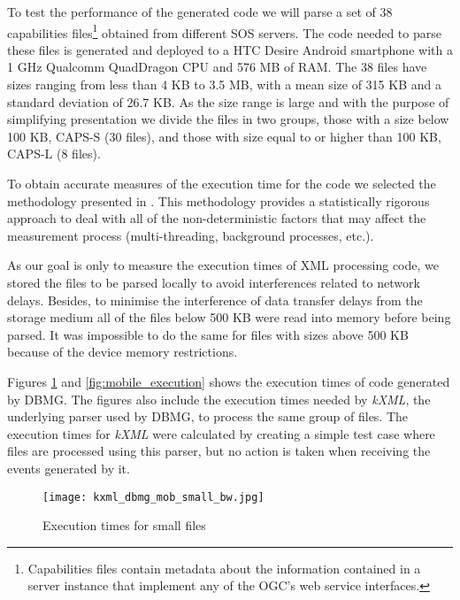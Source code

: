\documentclass{sig-alternate}
\begin{document}
To test the performance of the generated code  we will parse a set of 38 capabilities files\footnote{Capabilities files contain metadata about the information contained in a server instance that implement any of the  OGC's web service interfaces.} obtained from different SOS servers. The code needed to parse these files is generated and deployed to a HTC Desire Android smartphone with a 1 GHz Qualcomm QuadDragon CPU and 576 MB of RAM. The 38 files have sizes ranging from less than 4 KB to 3.5 MB, with a mean size of 315 KB and a standard deviation of 26.7 KB. As the size range is large and with the purpose of simplifying presentation we divide the files in two groups, those with a size below 100 KB, CAPS-S (30 files), and those with size equal to or higher than 100 KB, CAPS-L (8 files).

To obtain accurate measures of the execution time for the code we selected the methodology presented in \cite{proc:georges}. This methodology provides a statistically rigorous approach to deal with all of the non-deterministic factors that may affect the measurement process (multi-threading, background processes, etc.).

As our goal is only to measure the execution times of XML processing code, we stored the files to be parsed locally  to avoid interferences related to network delays. Besides, to minimise the interference of data transfer delays from the storage medium all of the files below 500 KB were read into memory before being parsed. It was impossible to do the same for files with sizes above 500 KB because of the device memory restrictions.

Figures \ref{mobile_execution_small} and \ref{fig:mobile_execution} shows the execution times of code generated by DBMG. The figures also include the execution times needed by \textit{kXML}, the underlying parser used by DBMG, to process the same group of files. The execution times for \textit{kXML} were calculated by creating a simple test case where files are processed using this parser, but no action is taken when receiving the events generated by it.

\begin{figure}
 \begin{center}
\texttt{[image: kxml\_dbmg\_mob\_small\_bw.jpg]}\\
\caption{Execution times for small files}\label{mobile_execution_small}
\end{center}
\end{figure} 
\end{document}

